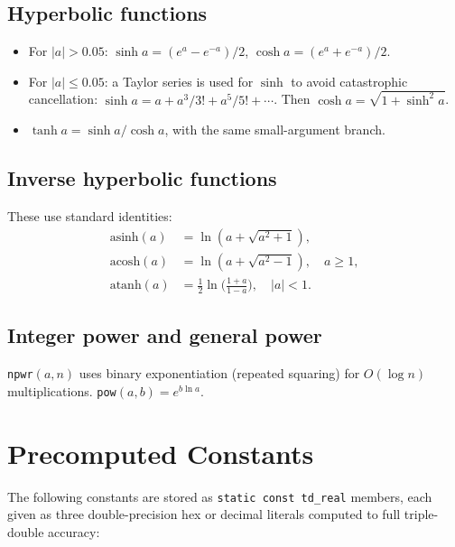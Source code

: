 \documentclass[11pt,a4paper]{article}
\begin{document}
\subsection{Hyperbolic functions}

\begin{itemize}
\item For $|a| > 0.05$: $\sinh a = (e^a - e^{-a})/2$,
  $\cosh a = (e^a + e^{-a})/2$.
\item For $|a| \le 0.05$: a Taylor series is used for $\sinh$ to
  avoid catastrophic cancellation:
  $\sinh a = a + a^3/3! + a^5/5! + \cdots$.
  Then $\cosh a = \sqrt{1 + \sinh^2 a}$.
\item $\tanh a = \sinh a / \cosh a$, with the same small-argument
  branch.
\end{itemize}

\subsection{Inverse hyperbolic functions}

These use standard identities:
\begin{align}
  \mathrm{asinh}(a) &= \ln(a + \sqrt{a^2 + 1}), \\
  \mathrm{acosh}(a) &= \ln(a + \sqrt{a^2 - 1}), \quad a \ge 1, \\
  \mathrm{atanh}(a) &= \tfrac{1}{2}\ln\!\bigl(\tfrac{1+a}{1-a}\bigr),
    \quad |a| < 1.
\end{align}

\subsection{Integer power and general power}

\texttt{npwr}$(a, n)$ uses binary exponentiation (repeated squaring)
for $O(\log n)$ multiplications.  \texttt{pow}$(a, b) = e^{b \ln a}$.


\section{Precomputed Constants}
\label{sec:constants}

The following constants are stored as \texttt{static const td\_real}
members, each given as three double-precision hex or decimal literals
computed to full triple-double accuracy:
\end{document}
